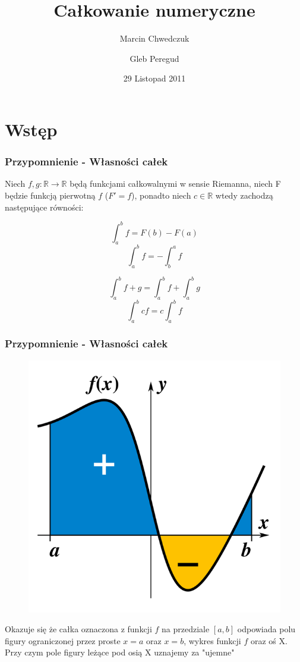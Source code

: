 \documentclass[compress,red]{beamer}
\author{Marcin Chwedczuk \and Gleb Peregud}
\title{%
Całkowanie numeryczne
}
\institute{%
Wydział Matematyki i Nauk Informacyjnych\\
Politechnika Warszawska
}
\date{29 Listopad 2011}
\begin{document}
    \begin{frame}
        \titlepage
    \end{frame}


\section{Wstęp}

	\begin{frame}
		\frametitle{Przypomnienie - Własności całek}

	    Niech $f, g: \mathbb{R} \rightarrow \mathbb{R}$ będą funkcjami całkowalnymi
	    w sensie Riemanna, niech F będzie funkcją pierwotną $f$ ($F' = f$), 
	    ponadto niech $c \in \mathbb{R}$ 
	    wtedy zachodzą następujące równości:
	    
	    \[ \int_a^b f = F(b) - F(a) \]
	    \[ \int_a^b f = - \int_b^a f \]
	    
	    \[ \int_a^b f + g  = \int_a^b f + \int_a^b g \]
	    \[ \int_a^b cf = c \int_a^b f \]
	\end{frame}
	
	\begin{frame}
		\frametitle{Przypomnienie - Własności całek}

		\begin{figure}
	    	\includegraphics[scale=0.8]{./img/integration_idea_2}
	    \end{figure}
	    
	    Okazuje się że całka oznaczona z funkcji $f$ na przedziale
	    $[a, b]$ odpowiada polu figury ograniczonej przez proste
	    $x = a$ oraz $x = b$, wykres funkcji $f$ oraz oś X.
	    Przy czym pole figury leżące pod osią X uznajemy za "ujemne" 
	\end{frame}
\end{document}
